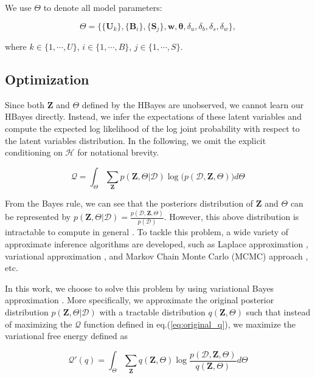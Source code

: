 We use $\Theta$ to denote all model parameters:

\begin{equation*}
\Theta = \Big\{\{\bm{U}_k\}, \{\bm{B}_i\}, \{\bm{S}_j\}, \bm{w}, \boldsymbol{\theta}, \delta_u,\delta_b,\delta_s,\delta_w \Big\},
\end{equation*}

\noindent where $k \in \{1, \cdots, U\}$, $i \in \{1, \cdots, B\}$, $j \in \{1, \cdots, S\}$. 


\subsection{Optimization}

Since both $\mathbf{Z}$ and $\Theta$ defined by the HBayes are unobserved, we cannot learn our HBayes directly. Instead, we infer the expectations of these latent variables and compute the expected log likelihood of the log joint probability with respect to the latent variables distribution. In the following, we omit the explicit conditioning on $\mathcal{H}$ for notational brevity. 

\begin{equation}
\label{eq:original_q}
\mathcal{Q} = \int_\Theta \sum_{\bm{Z}} p(\bm{Z}, \Theta| \mathcal{D})  \log \big( p(\mathcal{D},\bm{Z},\Theta) \big) d\Theta
\end{equation}

From the Bayes rule, we can see that the posteriors distribution of $\mathbf{Z}$ and $\Theta$ can be represented by $p(\bm{Z},\Theta|\mathcal{D}) = \frac{p(\mathcal{D},\bm{Z},\Theta)}{p(\mathcal{D})}$. However, this above distribution is intractable to compute in general \cite{dickey1983multiple}. To tackle this problem, a wide variety of approximate inference algorithms are developed, such as Laplace approximation \cite{rue2009approximate}, variational approximation \cite{bishop2006pattern}, and Markov Chain Monte Carlo (MCMC) approach \cite{blei2003latent}, etc.

In this work, we choose to solve this problem by using variational Bayes approximation \cite{bishop2006pattern}. More specifically, we approximate the original posterior distribution $p(\bm{Z}, \Theta| \mathcal{D})$ with a tractable distribution $q(\bm{Z}, \Theta)$ such that instead of maximizing the $\mathcal{Q}$ function defined in eq.(\ref{eq:original_q}), we maximize the variational free energy defined as 

\begin{equation}
\label{eq:original_variational_energy}
\mathcal{Q}'(q) = \int_\Theta \sum_{\bm{Z}} q(\bm{Z},\Theta) \log\frac{p(\mathcal{D},\bm{Z},\Theta)}{q(\bm{Z},\Theta)}d\Theta
\end{equation}


